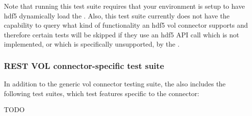 \documentclass[../users_guide.tex]{subfiles}
\begin{document}
Note that running this test suite requires that your environment is setup to have \acrshort{hdf5}
dynamically load the \rvc{}. Also, this test suite currently does not have the capability to query what
kind of functionality an \acrshort{hdf5} \acrshort{vol} \gls{connector} supports and therefore certain
tests will be skipped if they use an \acrshort{hdf5} API call which is not implemented, or which is
specifically unsupported, by the \rvc.

\subsubsection{REST VOL connector-specific test suite}

In addition to the generic \acrshort{vol} \gls{connector} testing suite, the \rvc{} also includes the
following test suites, which test features specific to the \gls{connector}:

TODO
\end{document}
